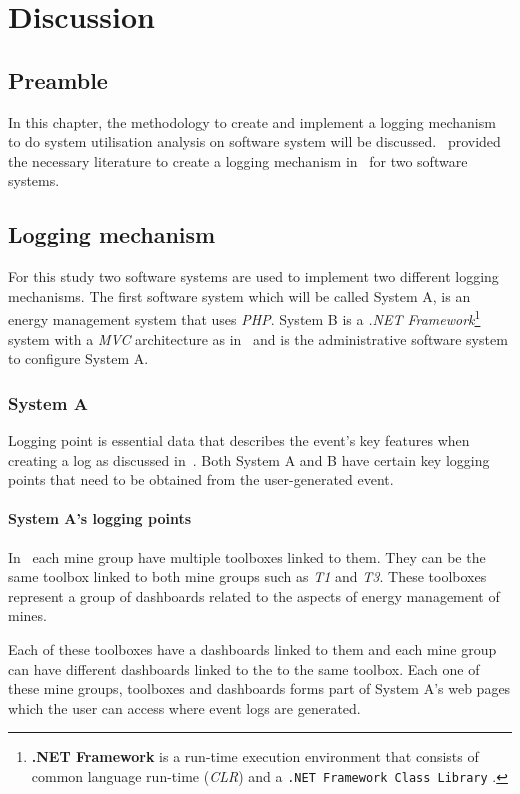
\chapter{Discussion}
\label{chap:5}

\section{Preamble}
In this chapter, the methodology to create and implement a logging mechanism to do system utilisation analysis on software system will be discussed.~ provided the necessary literature to create a logging mechanism in~ for two software systems.

\section{Logging mechanism}\label{sec:Ch3_LoggingMechanism}
For this study two software systems are used to implement two different logging mechanisms. The first software system which will be called System A, is an energy management system that uses \emph{PHP}. System B is a \emph{.NET Framework}\footnote{\label{ftn:NetFramework}\textbf{.NET Framework} is a run-time execution environment that consists of common language run-time (\emph{CLR}) and a \texttt{.NET Framework Class Library} \cite{Harkness2007}.} system with a \emph{MVC} architecture as in~ and is the administrative software system to configure System A.

\clearpage

\subsection{System A}
Logging point is essential data that describes the event's key features when creating a log as discussed in~. Both System A and B have certain key logging points that need to be obtained from the user-generated event.

\subsubsection{System A's logging points}\label{sec:SystemA_LoggingPoints}
In~ each mine group have multiple toolboxes linked to them. They can be the same toolbox linked to both mine groups such as \emph{T1} and \emph{T3}. These toolboxes represent a group of dashboards related to the aspects of energy management of mines.\par Each of these toolboxes have a dashboards linked to them and each mine group can have different dashboards linked to the to the same toolbox. Each one of these mine groups, toolboxes and dashboards forms part of System A's web pages which the user can access where event logs are generated.


